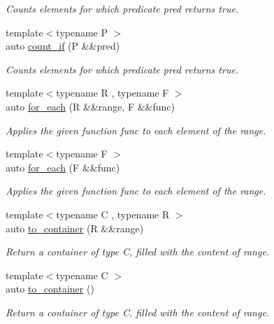 \begin{DoxyCompactItemize}
\begin{DoxyCompactList}\small\item\em Counts elements for which predicate pred returns true. \end{DoxyCompactList}\item 
{\footnotesize template$<$typename P $>$ }\\auto \mbox{\hyperlink{namespacerah_a9e22b56a1f28a353659fed572f33f5a9}{count\+\_\+if}} (P \&\&pred)
\begin{DoxyCompactList}\small\item\em Counts elements for which predicate pred returns true. \end{DoxyCompactList}\item 
{\footnotesize template$<$typename R , typename F $>$ }\\auto \mbox{\hyperlink{namespacerah_afd971bc9f9c098df8422e221adfb199f}{for\+\_\+each}} (R \&\&range, F \&\&func)
\begin{DoxyCompactList}\small\item\em Applies the given function func to each element of the range. \end{DoxyCompactList}\item 
{\footnotesize template$<$typename F $>$ }\\auto \mbox{\hyperlink{namespacerah_a76e2ce1a497aa3726cc9d99fb320ac67}{for\+\_\+each}} (F \&\&func)
\begin{DoxyCompactList}\small\item\em Applies the given function func to each element of the range. \end{DoxyCompactList}\item 
{\footnotesize template$<$typename C , typename R $>$ }\\auto \mbox{\hyperlink{namespacerah_a11fcae12055a2bcf5ac7c41e25e74a32}{to\+\_\+container}} (R \&\&range)
\begin{DoxyCompactList}\small\item\em Return a container of type C, filled with the content of range. \end{DoxyCompactList}\item 
{\footnotesize template$<$typename C $>$ }\\auto \mbox{\hyperlink{namespacerah_aac33763a1f49060e179c2c2053ec07a2}{to\+\_\+container}} ()
\begin{DoxyCompactList}\small\item\em Return a container of type C, filled with the content of range. \end{DoxyCompactList}\item 

\end{DoxyCompactItemize}
